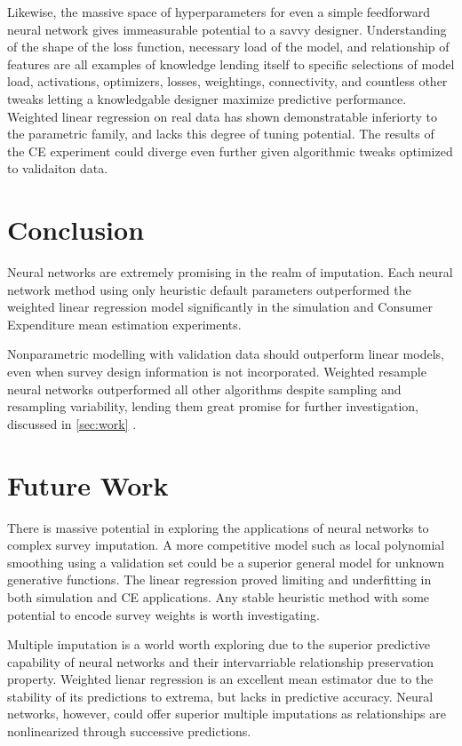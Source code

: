 \documentclass[12pt,twoside]{reedthesis}
\begin{document}
Likewise, the massive space of hyperparameters for even a simple
feedforward neural network gives immeasurable potential to a savvy
designer. Understanding of the shape of the loss function, necessary
load of the model, and relationship of features are all examples of
knowledge lending itself to specific selections of model load,
activations, optimizers, losses, weightings, connectivity, and countless
other tweaks letting a knowledgable designer maximize predictive
performance. Weighted linear regression on real data has shown
demonstratable inferiorty to the parametric family, and lacks this
degree of tuning potential. The results of the CE experiment could
diverge even further given algorithmic tweaks optimized to validaiton
data.

\section{Conclusion}\label{conclusion-1}

Neural networks are extremely promising in the realm of imputation. Each
neural network method using only heuristic default parameters
outperformed the weighted linear regression model significantly in the
simulation and Consumer Expenditure mean estimation experiments.

Nonparametric modelling with validation data should outperform linear
models, even when survey design information is not incorporated.
Weighted resample neural networks outperformed all other algorithms
despite sampling and resampling variability, lending them great promise
for further investigation, discussed in \ref{sec:work} .

\section{Future Work}\label{work}

There is massive potential in exploring the applications of neural
networks to complex survey imputation. A more competitive model such as
local polynomial smoothing using a validation set could be a superior
general model for unknown generative functions. The linear regression
proved limiting and underfitting in both simulation and CE applications.
Any stable heuristic method with some potential to encode survey weights
is worth investigating.

Multiple imputation is a world worth exploring due to the superior
predictive capability of neural networks and their intervarriable
relationship preservation property. Weighted lienar regression is an
excellent mean estimator due to the stability of its predictions to
extrema, but lacks in predictive accuracy. Neural networks, however,
could offer superior multiple imputations as relationships are
nonlinearized through successive predictions.
\end{document}
